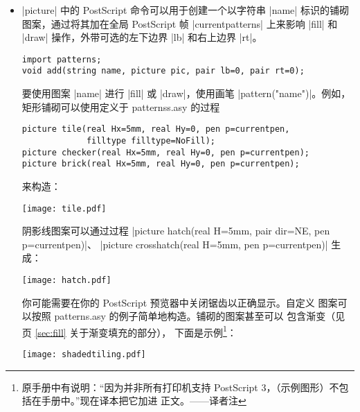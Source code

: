 \documentclass[nofonts,CJKnormalspaces]{ctexbook}[2009/05/20]
\newcommand*\prgname[1]{\textsf{#1}}
\newcommand\transnote[1]{\footnote{#1——译者注}}
\begin{document}
\begin{itemize}
  由于 \prgname{PostScript} 不支持透明，这个特性仅对 \verb=-f pdf= 输出格式
  选项有效。可以从 PDF 结果文件通过 \prgname{ImageMagick convert} 程序生成。
  标签永远以 |opacity| 值 |1| 绘制。透明填充的一个简单例子在示例文件
  \prgname{transparency.asy} 中给出\transnote{效果如下：\\
  \vbox{}%
  \texttt{[image: transparency.pdf]}\box0}。

\item |picture| 中的 \prgname{PostScript} 命令可以用于创建一个以字符串 |name|
  标识的铺砌图案，通过将其加在全局 \prgname{PostScript} 帧 |currentpatterns|
  上来影响 |fill| 和 |draw| 操作，外带可选的左下边界 |lb| 和右上边界 |rt|。
\begin{lstlisting}
import patterns;
void add(string name, picture pic, pair lb=0, pair rt=0);
\end{lstlisting}

  要使用图案 |name| 进行 |fill| 或 |draw|，使用画笔 |pattern("name")|。例如，
  矩形铺砌可以使用定义于 \prgname{patternss.asy} 的过程
\begin{lstlisting}
picture tile(real Hx=5mm, real Hy=0, pen p=currentpen,
             filltype filltype=NoFill);
picture checker(real Hx=5mm, real Hy=0, pen p=currentpen);
picture brick(real Hx=5mm, real Hy=0, pen p=currentpen);
\end{lstlisting}
  来构造：

\begin{center}
  \texttt{[image: tile.pdf]}
\end{center}
  阴影线图案可以通过过程
  |picture hatch(real H=5mm, pair dir=NE, pen p=currentpen)|、
  |picture crosshatch(real H=5mm, pen p=currentpen)| 生成：

\begin{center}
  \texttt{[image: hatch.pdf]}
\end{center}

  你可能需要在你的 \prgname{PostScript} 预览器中关闭锯齿以正确显示。自定义
  图案可以按照 \prgname{patterns.asy} 的例子简单地构造。铺砌的图案甚至可以
  包含渐变（见 \pageref{sec:fill} 页 \ref{sec:fill} 关于渐变填充的部分），
  下面是示例\transnote{原手册中有说明：“因为并非所有打印机支持
  \prgname{PostScript 3}，（示例图形）不包括在手册中。”现在译本把它加进
  正文。}：

\begin{center}
  \texttt{[image: shadedtiling.pdf]}
\end{center}


\end{itemize}
\end{document}
